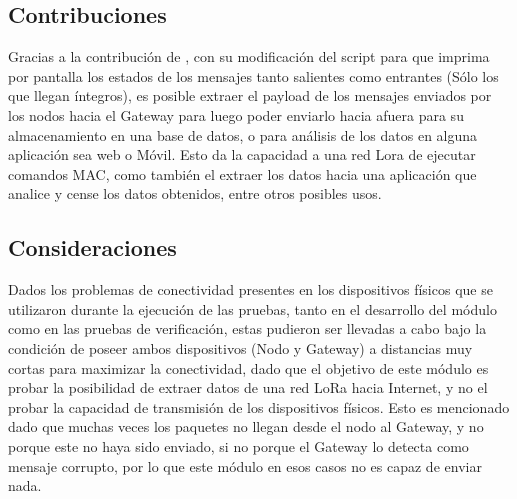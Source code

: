 \begin{justify}
\subsection{Contribuciones}
Gracias a la contribución de \cite{tomas}, con su modificación del script para que imprima por pantalla los estados de los mensajes tanto salientes como entrantes (Sólo los que llegan íntegros), es posible extraer el payload de los mensajes enviados por los nodos hacia el Gateway para luego poder enviarlo hacia afuera para su almacenamiento en una base de datos, o para análisis de los datos en alguna aplicación sea web o Móvil. Esto da la capacidad a una red Lora de ejecutar comandos MAC, como también el extraer los datos hacia una aplicación que analice y cense los datos obtenidos, entre otros posibles usos.
\subsection{Consideraciones}
Dados los problemas de conectividad presentes en los dispositivos físicos que se utilizaron durante la ejecución de las pruebas, tanto en el desarrollo del módulo como en las pruebas  de verificación, estas pudieron ser llevadas a cabo bajo la condición de poseer ambos dispositivos (Nodo y Gateway) a distancias muy cortas para maximizar la conectividad, dado que el objetivo de este módulo es probar la posibilidad de extraer datos de una red LoRa hacia Internet, y no el probar la capacidad de transmisión de los dispositivos físicos. Esto es mencionado dado que muchas veces los paquetes no llegan desde el nodo al Gateway, y no porque este no haya sido enviado, si no porque el Gateway lo detecta como mensaje corrupto, por lo que este módulo en esos casos no es capaz de enviar nada.
\end{justify}